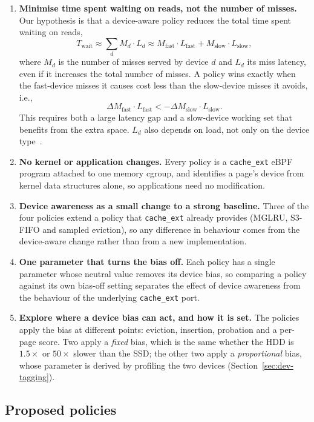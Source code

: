 \documentclass[11pt,sigconf,nonacm]{acmart}
\newcommand{\cacheExt}{\texttt{cache\_ext}}
\begin{document}
\begin{enumerate}[leftmargin=1.5em, topsep=2pt, itemsep=1pt]
    \item \textbf{Minimise time spent waiting on reads, not the number of misses.} Our hypothesis is that a device-aware policy reduces the total time spent waiting on reads,
    \[
    T_\text{wait} \approx \sum_{d} M_d \cdot L_d \approx M_\text{fast} \cdot L_\text{fast} + M_\text{slow} \cdot L_\text{slow} ,
    \]
    where $M_d$ is the number of misses served by device $d$ and $L_d$ its miss latency, even if it increases the total number of misses. A policy wins exactly when the fast-device misses it causes cost less than the slow-device misses it avoids, i.e.,
    \[
    \Delta M_\text{fast} \cdot L_\text{fast} < -\Delta M_\text{slow} \cdot L_\text{slow} .
    \]
    This requires both a large latency gap and a slow-device working set that benefits from the extra space. $L_d$ also depends on load, not only on the device type~\cite{orthus}.
    \item \textbf{No kernel or application changes.} Every policy is a \cacheExt{} eBPF program attached to one memory cgroup, and identifies a page's device from kernel data structures alone, so applications need no modification.
    \item \textbf{Device awareness as a small change to a strong baseline.} Three of the four policies extend a policy that \cacheExt{} already provides (MGLRU, S3-FIFO and sampled eviction), so any difference in behaviour comes from the device-aware change rather than from a new implementation.
    \item \textbf{One parameter that turns the bias off.} Each policy has a single parameter whose neutral value removes its device bias, so comparing a policy against its own bias-off setting separates the effect of device awareness from the behaviour of the underlying \cacheExt{} port.
    \item \textbf{Explore where a device bias can act, and how it is set.} The policies apply the bias at different points: eviction, insertion, probation and a per-page score. Two apply a \emph{fixed} bias, which is the same whether the HDD is $1.5\times$ or $50\times$ slower than the SSD; the other two apply a \emph{proportional} bias, whose parameter is derived by profiling the two devices (Section~\ref{sec:dev-tagging}).
\end{enumerate}

\subsection{Proposed policies}
\end{document}
